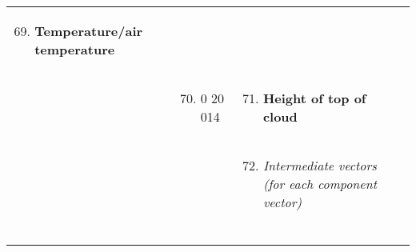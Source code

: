 \begin{longtable}[]{@{}llll@{}}
\begin{minipage}[t]{0.22\columnwidth}
\begin{enumerate}
\setcounter{enumi}{68}
\item
  \textbf{Temperature/air temperature}
\end{enumerate}\strut
\end{minipage} & \begin{minipage}[t]{0.22\columnwidth}\raggedright
\strut
\end{minipage}\tabularnewline
\begin{minipage}[t]{0.22\columnwidth}\raggedright
\strut
\end{minipage} & \begin{minipage}[t]{0.22\columnwidth}\raggedright
\begin{enumerate}
\setcounter{enumi}{69}
\item
  0 20 014
\end{enumerate}\strut
\end{minipage} & \begin{minipage}[t]{0.22\columnwidth}\raggedright
\begin{enumerate}
\setcounter{enumi}{70}
\item
  \textbf{Height of top of cloud}
\end{enumerate}\strut
\end{minipage} & \begin{minipage}[t]{0.22\columnwidth}\raggedright
\strut
\end{minipage}\tabularnewline
\begin{minipage}[t]{0.22\columnwidth}\raggedright
\strut
\end{minipage} & \begin{minipage}[t]{0.22\columnwidth}\raggedright
\strut
\end{minipage} & \begin{minipage}[t]{0.22\columnwidth}\raggedright
\begin{enumerate}
\setcounter{enumi}{71}
\item
  \emph{Intermediate vectors (for each component vector)}
\end{enumerate}\strut
\end{minipage} & \begin{minipage}[t]{0.22\columnwidth}\raggedright
\strut
\end{minipage}\tabularnewline
\begin{minipage}[t]{0.22\columnwidth}\raggedright
\strut
\end{minipage} & \begin{minipage}[t]{0.22\columnwidth}\raggedright
\begin{enumerate}

\end{enumerate}
\end{minipage}
\end{longtable}

